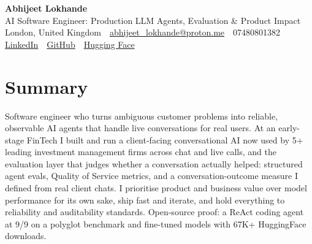 \documentclass[10pt,a4paper]{article}
\newcommand{\sep}{\,\textcolor{accent!60}{\textbar}\,}
\begin{document}
\begin{center}
  {\fontsize{24}{26}\selectfont\bfseries Abhijeet Lokhande}\\[3pt]
  {\color{accent}\large AI Software Engineer: Production LLM Agents, Evaluation \& Product Impact}\\[5pt]
  {\small
    London, United Kingdom \sep
    \href{mailto:abhijeet_lokhande@proton.me}{abhijeet\_lokhande@proton.me} \sep
    07480801382 \\[2pt]
    \href{https://www.linkedin.com/in/ablds/}{LinkedIn} \sep
    \href{https://github.com/abhijeetscode}{GitHub} \sep
    \href{https://huggingface.co/ab-ai}{Hugging Face}
  }
\end{center}
\vspace{2pt}

\section{Summary}
Software engineer who turns ambiguous customer problems into reliable, observable AI agents that handle live conversations for real users. At an early-stage FinTech I built and run a client-facing conversational AI now used by 5+ leading investment management firms across chat and live calls, and the evaluation layer that judges whether a conversation actually helped: structured agent evals, Quality of Service metrics, and a conversation-outcome measure I defined from real client chats. I prioritise product and business value over model performance for its own sake, ship fast and iterate, and hold everything to reliability and auditability standards. Open-source proof: a ReAct coding agent at 9/9 on a polyglot benchmark and fine-tuned models with 67K+ HuggingFace downloads.

\end{document}
